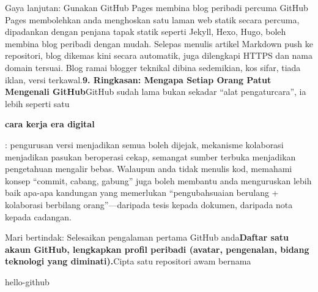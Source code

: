 \begin{tcbinfo}{Gaya lanjutan: Gunakan GitHub Pages membina blog peribadi percuma}
GitHub Pages membolehkan anda menghoskan satu laman web statik secara percuma, dipadankan dengan penjana tapak statik seperti Jekyll, Hexo, Hugo, boleh membina blog peribadi dengan mudah. Selepas menulis artikel Markdown push ke repositori, blog dikemas kini secara automatik, juga dilengkapi HTTPS dan nama domain tersuai. Blog ramai blogger teknikal dibina sedemikian, kos sifar, tiada iklan, versi terkawal.\textbf{9. Ringkasan: Mengapa Setiap Orang Patut Mengenali GitHub}GitHub sudah lama bukan sekadar “alat pengaturcara”, ia lebih seperti satu

\end{tcbinfo}

\textbf{cara kerja era digital}\par

: pengurusan versi menjadikan semua boleh dijejak, mekanisme kolaborasi menjadikan pasukan beroperasi cekap, semangat sumber terbuka menjadikan pengetahuan mengalir bebas. Walaupun anda tidak menulis kod, memahami konsep “commit, cabang, gabung” juga boleh membantu anda menguruskan lebih baik apa-apa kandungan yang memerlukan “pengubahsuaian berulang + kolaborasi berbilang orang”—daripada tesis kepada dokumen, daripada nota kepada cadangan.


Mari bertindak: Selesaikan pengalaman pertama GitHub anda\textbf{Daftar satu akaun GitHub, lengkapkan profil peribadi (avatar, pengenalan, bidang teknologi yang diminati).}Cipta satu repositori awam bernama

hello-github

